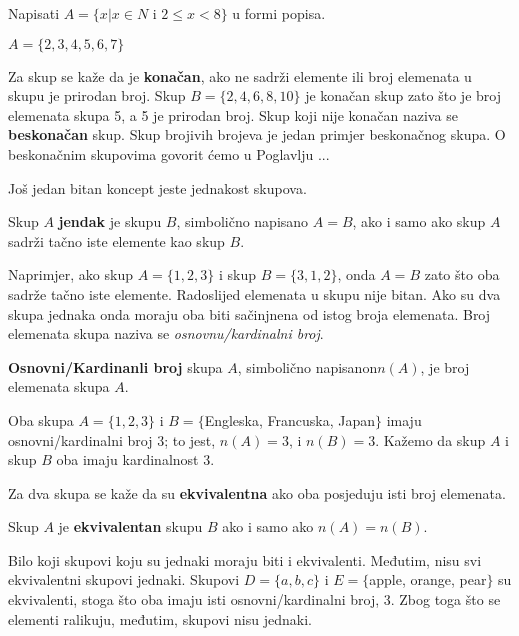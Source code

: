 \documentclass[a4paper,14pt,svgnames]{article}
\newcounter{counter}
\newcommand{\examplecounter}{\textbf{\refstepcounter{counter}PRIMJER \thecounter}}
\begin{document}
\begin{tcolorbox}[title=\large \examplecounter \hfill\small\textbf{"Notacija građenja skupova u formi popisa"}]
Napisati $A=\{x|x\in N$ i $2\leqslant x<8\}$ u formi popisa.
\begin{tcolorbox}[title=\small \textbf{RJEŠENJE},colback=white]
\begin{center}
$A=\{2, 3, 4, 5, 6, 7\}$
\end{center}
\end{tcolorbox}
\end{tcolorbox}

Za skup se kaže da je \textbf{konačan}, ako ne sadrži elemente ili broj elemenata u skupu je prirodan broj. Skup $B=\{2, 4, 6, 8, 10\}$ je konačan skup zato što je broj elemenata skupa 5, a 5 je prirodan broj. Skup koji nije konačan naziva se \textbf{beskonačan} skup. Skup brojivih brojeva je jedan primjer beskonačnog skupa. O beskonačnim skupovima govorit ćemo u Poglavlju ...\par\smallskip
Još jedan bitan koncept jeste jednakost skupova.\smallskip
\begin{tcolorbox}
Skup $A$ \textbf{jendak} je skupu $B$, simbolično napisano $A=B$, ako i samo ako skup $A$ sadrži tačno iste elemente kao skup $B$.
\end{tcolorbox}\smallskip
\noindent Naprimjer, ako skup $A=\{1, 2, 3\}$ i skup $B=\{3, 1, 2\}$, onda $A=B$ zato što oba sadrže tačno iste elemente. Radoslijed elemenata u skupu nije bitan. Ako su dva skupa jednaka onda moraju oba biti sačinjnena od istog broja elemenata. Broj elemenata skupa naziva se \textit{osnovnu/kardinalni broj}.\smallskip
\begin{tcolorbox}
\textbf{Osnovni/Kardinanli broj} skupa $A$, simbolično napisanon$n(A)$, je broj elemenata skupa $A$.
\end{tcolorbox}\smallskip
Oba skupa $A=\{1, 2, 3\}$ i $B=\{$Engleska, Francuska, Japan$\}$ imaju osnovni/kardinalni broj 3; to jest, $n(A)=3$, i $n(B)=3$. Kažemo da skup $A$ i skup $B$ oba imaju kardinalnost 3.\par
Za dva skupa se kaže da su \textbf{ekvivalentna} ako oba posjeduju isti broj elemenata.\smallskip
\begin{tcolorbox}
Skup $A$ je \textbf{ekvivalentan} skupu $B$ ako i samo ako $n(A)=n(B)$.
\end{tcolorbox}\smallskip
\noindent Bilo koji skupovi koju su jednaki moraju biti i ekvivalenti. Međutim, nisu svi ekvivalentni skupovi jednaki. Skupovi $D=\{a, b, c\}$ i $E=\{$apple, orange, pear$\}$ su ekvivalenti, stoga što oba imaju isti osnovni/kardinalni broj, 3. Zbog toga što se elementi ralikuju, međutim, skupovi nisu jednaki.\par
\end{document}
